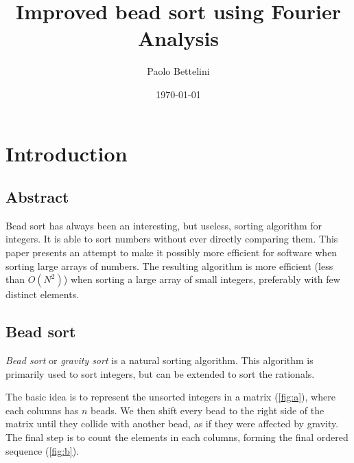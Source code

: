 \documentclass{article}
\title{Improved bead sort using Fourier Analysis}
\author{Paolo Bettelini}
\date{\today}
\begin{document}
\maketitle

\section{Introduction}

\subsection{Abstract}

Bead sort has always been an interesting, but useless, sorting algorithm
for integers. It is able to sort numbers without ever directly comparing them.
This paper presents an attempt to make it possibly more efficient
for software when sorting large arrays of numbers.
The resulting algorithm is more efficient (less than \(O(N^2)\)) when sorting a large array of small integers,
preferably with few distinct elements.

\subsection{Bead sort}

\textit{Bead sort}\cite{beadsort} or \textit{gravity sort}
is a natural sorting algorithm.
This algorithm is primarily used to sort
integers, but can be extended to sort the rationals.

The basic idea is to represent the unsorted integers
in a matrix (\ref{fig:a}), where each columns has \(n\) beads.
We then shift every bead to the right side of the matrix
until they collide with another bead,
as if they were affected by gravity.
The final step is to count the elements in each columns,
forming the final ordered sequence (\ref{fig:b}).
\end{document}

